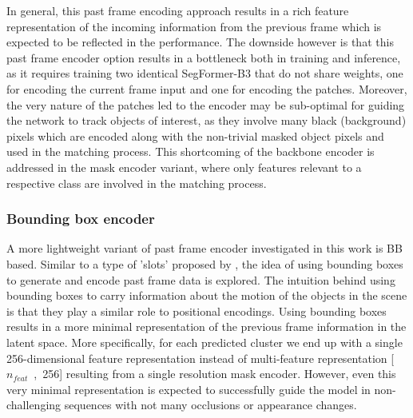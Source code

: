 In general, this past frame encoding approach results in a rich feature representation of the incoming information from the previous frame which is expected to be reflected in the performance. The downside however is that this past frame encoder option results in a bottleneck both in training and inference, as it requires training two identical SegFormer-B3 that do not share weights, one for encoding the current frame input and one for encoding the patches. 
Moreover, the very nature of the patches led to the encoder may be sub-optimal 
for guiding the network to track objects of interest, as they involve many black (background) pixels which are encoded along with the non-trivial masked object pixels and used in the matching process. This shortcoming of the backbone encoder is addressed in the mask encoder variant, where only features relevant to a respective class are involved in the matching process.


\subsubsection{Bounding box encoder}


A more lightweight variant of past frame encoder investigated in this work is \gls{BB} 
based. Similar to a type of 'slots' proposed by \cite{savi}, the idea of using bounding boxes to generate and encode past frame data is explored. The intuition behind using bounding boxes to carry information about the motion of the objects in the scene is that they play a similar role to positional encodings.
Using bounding boxes results in a more minimal representation of the previous frame information in the latent space. More specifically, for each predicted cluster we end up with a single 256-dimensional feature representation instead of multi-feature representation [$n_{feat}$~,~256] resulting from a single resolution mask encoder. However, even this very minimal representation is expected to successfully guide the model in non-challenging sequences with not many occlusions or appearance changes.\par


